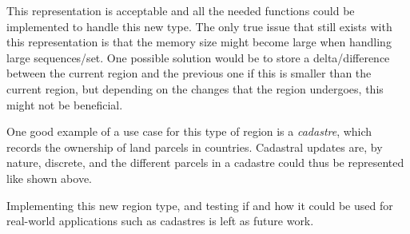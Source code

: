 This representation is acceptable and all the needed functions could be implemented to handle this new type. The only true issue that still exists with this representation is that the memory size might become large when handling large sequences/set. One possible solution would be to store a delta/difference between the current region and the previous one if this is smaller than the current region, but depending on the changes that the region undergoes, this might not be beneficial.

One good example of a use case for this type of region is a \textit{cadastre}, which records the ownership of land parcels in countries. Cadastral updates are, by nature, discrete, and the different parcels in a cadastre could thus be represented like shown above.

Implementing this new region type, and testing if and how it could be used for real-world applications such as cadastres is left as future work.
